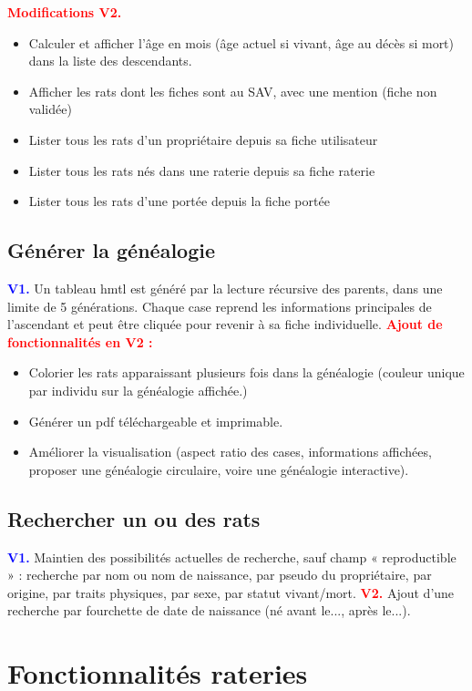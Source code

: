 \documentclass[a4paper,10pt]{article}
\newcommand\existant[1]{\noindent\textbf{\textcolor{blue}{#1}}}
\newcommand\desire[1]{\noindent\textbf{\textcolor{red}{#1}}}
\begin{document}
\desire{Modifications V2.}
\begin{itemize}
\item Calculer et afficher l'âge en mois (âge actuel si vivant, âge au décès si mort) dans la liste des descendants.
\item Afficher les rats dont les fiches sont au SAV, avec une mention (fiche non validée) 
\item Lister tous les rats d'un propriétaire depuis sa fiche utilisateur
\item Lister tous les rats nés dans une raterie depuis sa fiche raterie
\item Lister tous les rats d'une portée depuis la fiche portée
\end{itemize}

\subsection{Générer la généalogie}
\existant{V1.} Un tableau hmtl est généré par la lecture récursive des parents, dans une limite de 5 générations. Chaque case reprend les informations principales de l'ascendant et peut être cliquée pour revenir à sa fiche individuelle. 
\desire{Ajout de fonctionnalités en V2 :} 
\begin{itemize}
\item Colorier les rats apparaissant plusieurs fois dans la généalogie (couleur unique par individu sur la généalogie affichée.)
\item Générer un pdf téléchargeable et imprimable.
\item Améliorer la visualisation (aspect ratio des cases, informations affichées, proposer une généalogie circulaire, voire une généalogie interactive).
\end{itemize}

\subsection{Rechercher un ou des rats}

\existant{V1.} Maintien des possibilités actuelles de recherche, sauf champ « reproductible » : recherche par nom ou nom de naissance, par pseudo du propriétaire, par origine, par traits physiques, par sexe, par statut vivant/mort.
\desire{V2.} Ajout d'une recherche par fourchette de date de naissance (né avant le..., après le...).

\section{Fonctionnalités rateries}
\end{document}
